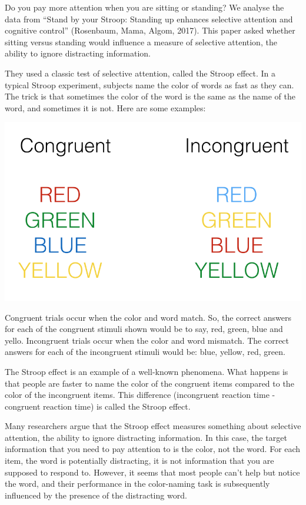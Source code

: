 \documentclass[]{book}
\theoremstyle{definition}
\theoremstyle{definition}
\theoremstyle{definition}
\theoremstyle{remark}
\begin{document}
Do you pay more attention when you are sitting or standing? We analyse
the data from ``Stand by your Stroop: Standing up enhances selective
attention and cognitive control'' (Rosenbaum, Mama, Algom, 2017). This
paper asked whether sitting versus standing would influence a measure of
selective attention, the ability to ignore distracting information.

They used a classic test of selective attention, called the Stroop
effect. In a typical Stroop experiment, subjects name the color of words
as fast as they can. The trick is that sometimes the color of the word
is the same as the name of the word, and sometimes it is not. Here are
some examples:

\includegraphics[width=11.67in]{figures/Stroop}

Congruent trials occur when the color and word match. So, the correct
answers for each of the congruent stimuli shown would be to say, red,
green, blue and yello. Incongruent trials occur when the color and word
mismatch. The correct answers for each of the incongruent stimuli would
be: blue, yellow, red, green.

The Stroop effect is an example of a well-known phenomena. What happens
is that people are faster to name the color of the congruent items
compared to the color of the incongruent items. This difference
(incongruent reaction time - congruent reaction time) is called the
Stroop effect.

Many researchers argue that the Stroop effect measures something about
selective attention, the ability to ignore distracting information. In
this case, the target information that you need to pay attention to is
the color, not the word. For each item, the word is potentially
distracting, it is not information that you are supposed to respond to.
However, it seems that most people can't help but notice the word, and
their performance in the color-naming task is subsequently influenced by
the presence of the distracting word.
\end{document}
